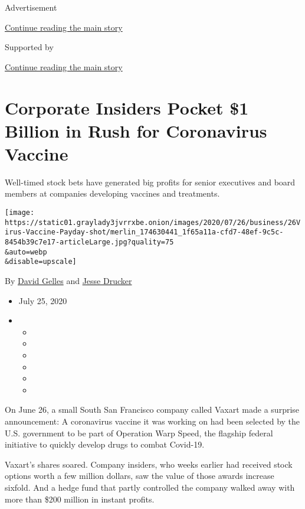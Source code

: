 Advertisement

\protect\hyperlink{after-top}{Continue reading the main story}

Supported by

\protect\hyperlink{after-sponsor}{Continue reading the main story}

\hypertarget{corporate-insiders-pocket-1-billion-in-rush-for-coronavirus-vaccine}{%
\section{Corporate Insiders Pocket \$1 Billion in Rush for Coronavirus
Vaccine}\label{corporate-insiders-pocket-1-billion-in-rush-for-coronavirus-vaccine}}

Well-timed stock bets have generated big profits for senior executives
and board members at companies developing vaccines and treatments.

\texttt{[image: https://static01.graylady3jvrrxbe.onion/images/2020/07/26/business/26Virus-Vaccine-Payday-shot/merlin\_174630441\_1f65a11a-cfd7-48ef-9c5c-8454b39c7e17-articleLarge.jpg?quality=75\\\&auto=webp\\\&disable=upscale]}

By \href{https://www.nytimes3xbfgragh.onion/by/david-gelles}{David
Gelles} and
\href{https://www.nytimes3xbfgragh.onion/by/jesse-drucker}{Jesse
Drucker}

\begin{itemize}
\item
  July 25, 2020
\item
  \begin{itemize}
  \item
  \item
  \item
  \item
  \item
  \item
  \end{itemize}
\end{itemize}

On June 26, a small South San Francisco company called Vaxart made a
surprise announcement: A coronavirus vaccine it was working on had been
selected by the U.S. government to be part of Operation Warp Speed, the
flagship federal initiative to quickly develop drugs to combat Covid-19.

Vaxart's shares soared. Company insiders, who weeks earlier had received
stock options worth a few million dollars, saw the value of those awards
increase sixfold. And a hedge fund that partly controlled the company
walked away with more than \$200 million in instant profits.

